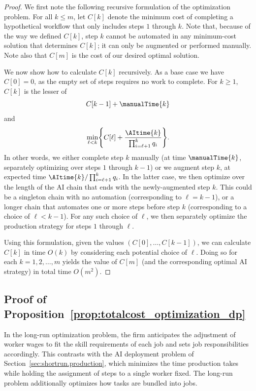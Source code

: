 \begin{proof}
We first note the following recursive formulation of the optimization problem.
For all $k \leq m$, let $C[k]$ denote the minimum cost of completing a hypothetical workflow that only includes steps $1$ through $k$.
Note that, because of the way we defined $C[k]$, step $k$ cannot be automated in any minimum-cost solution that determines $C[k]$; it can only be augmented or performed manually.
Note also that $C[m]$ is the cost of our desired optimal solution.

We now show how to calculate $C[k]$ recursively.
As a base case we have $C[0] = 0$, as the empty set of steps requires no work to complete.
For $k \geq 1$, $C[k]$ is the lesser of
\[ C[k-1] + \manualTime{k} \]
and
\[ \min_{\ell < k} \Biggl\{ C[\ell] + \frac{\AItime{k}}{\prod_{i=\ell+1}^k q_i} \Biggr\}.
\]
In other words, we either complete step $k$ manually (at time $\manualTime{k}$, separately optimizing over steps $1$ through $k-1$) or we augment step $k$, at expected time $\AItime{k}/\prod_{i=\ell+1}^k q_i$.
In the latter case, we then optimize over the length of the AI chain that ends with the newly-augmented step $k$.
This could be a singleton chain with no automation (corresponding to $\ell = k-1$), or a longer chain that automates one or more steps before step $k$ (corresponding to a choice of $\ell < k-1$).
For any such choice of $\ell$, we then separately optimize the production strategy for steps $1$ through $\ell$.

Using this formulation, given the values $(C[0], \dotsc, C[k-1])$, we can calculate $C[k]$ in time $O(k)$ by considering each potential choice of $\ell$.
Doing so for each $k = 1, 2, \dotsc, m$ yields the value of $C[m]$ (and the corresponding optimal AI strategy) in total time $O(m^2)$.
\end{proof}

\subsection{Proof of Proposition~\ref{prop:totalcost_optimization_dp}}
\label{app:jobdesign.longrun}

In the long-run optimization problem, the firm anticipates the adjustment of worker wages to fit the skill requirements of each job and sets job responsibilities accordingly.
This contrasts with the AI deployment problem of Section~\ref{sec:shortrun.production}, which minimizes the time production takes while holding the assignment of steps to a single worker fixed. 
The long-run problem additionally optimizes how tasks are bundled into jobs.

